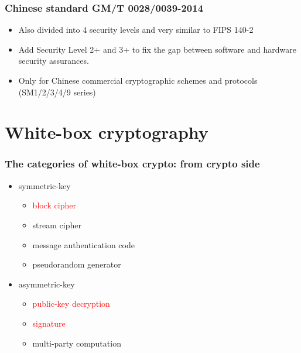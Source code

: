 \documentclass[aspectratio=169,xcolor=dvipsnames]{beamer}
\begin{document}
\frame
{
\frametitle{Chinese standard GM/T 0028/0039-2014}
\begin{itemize}
\setlength{\itemsep}{12pt}
\item Also divided into 4 security levels and very similar to FIPS 140-2

\item Add Security Level 2+ and 3+ to fix the gap between software and hardware security assurances.

\item Only for Chinese commercial cryptographic schemes and protocols (SM1/2/3/4/9 series)

\end{itemize}
}

\section{White-box cryptography}
\frame
{
  \frametitle{The categories of white-box crypto: from crypto side}

\begin{itemize}
\setlength{\itemsep}{12pt}
\item symmetric-key
\begin{itemize}

\item \textcolor{red}{block cipher}
\item stream cipher
\item message authentication code
\item pseudorandom generator
\end{itemize}

\item asymmetric-key
\begin{itemize}
\item \textcolor{red}{public-key decryption}
\item \textcolor{red}{signature}
\item multi-party computation
\end{itemize}
\end{itemize}
}
\end{document}
